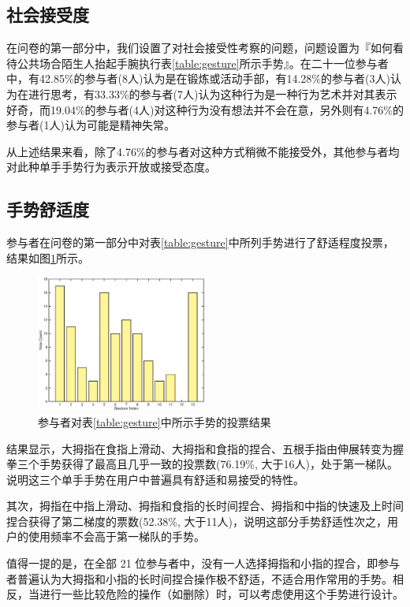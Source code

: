 \subsection{社会接受度}

在问卷的第一部分中，我们设置了对社会接受性考察的问题，问题设置为『如何看待公共场合陌生人抬起手腕执行表\ref{table:gesture}所示手势』。在二十一位参与者中，有42.85\%的参与者(8人)认为是在锻炼或活动手部，有14.28\%的参与者(3人)认为在进行思考，有33.33\%的参与者(7人)认为这种行为是一种行为艺术并对其表示好奇，而19.04\%的参与者(4人)对这种行为没有想法并不会在意，另外则有4.76\%的参与者(1人)认为可能是精神失常。

从上述结果来看，除了4.76\%的参与者对这种方式稍微不能接受外，其他参与者均对此种单手手势行为表示开放或接受态度。

\subsection{手势舒适度}

参与者在问卷的第一部分中对表\ref{table:gesture}中所列手势进行了舒适程度投票，结果如图\ref{fig:gesture-vote}所示。

\begin{figure}[H]
    \kaishu
    \centering
    \includegraphics[width=0.5\textwidth]{figures/gesture-vote}
    \caption{\kaishu 参与者对表\ref{table:gesture}中所示手势的投票结果}
    \label{fig:gesture-vote}
\end{figure}

结果显示，大拇指在食指上滑动、大拇指和食指的捏合、五根手指由伸展转变为握拳三个手势获得了最高且几乎一致的投票数(76.19\%, 大于16人)，处于第一梯队。说明这三个单手手势在用户中普遍具有舒适和易接受的特性。

其次，拇指在中指上滑动、拇指和食指的长时间捏合、拇指和中指的快速及上时间捏合获得了第二梯度的票数(52.38\%, 大于11人)，说明这部分手势舒适性次之，用户的使用频率不会高于第一梯队的手势。

值得一提的是，在全部 21 位参与者中，没有一人选择拇指和小指的捏合，即参与者普遍认为大拇指和小指的长时间捏合操作极不舒适，不适合用作常用的手势。相反，当进行一些比较危险的操作（如删除）时，可以考虑使用这个手势进行设计。

